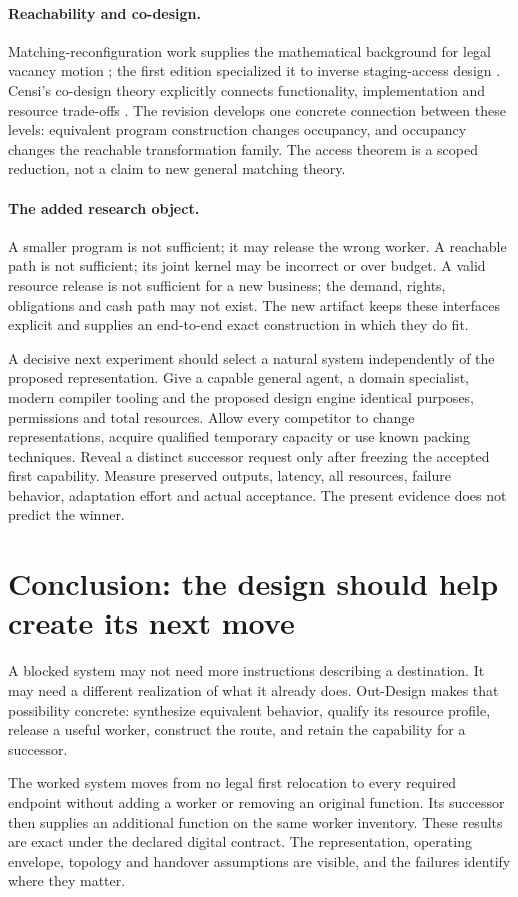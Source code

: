 \documentclass[11pt,letterpaper]{article}
\theoremstyle{definition}\newtheorem{definition}[theorem]{Definition}
\theoremstyle{remark}\newtheorem{remark}[theorem]{Remark}
\newcommand{\phead}[1]{\Needspace{4\baselineskip}\paragraph{#1}}
\begin{document}
\phead{Reachability and co-design.}
Matching-reconfiguration work supplies the mathematical background for legal vacancy motion \citep{aichholzer}; the first edition specialized it to inverse staging-access design \citep{design1}. Censi's co-design theory explicitly connects functionality, implementation and resource trade-offs \citep{censi}. The revision develops one concrete connection between these levels: equivalent program construction changes occupancy, and occupancy changes the reachable transformation family. The access theorem is a scoped reduction, not a claim to new general matching theory.

\phead{The added research object.}
A smaller program is not sufficient; it may release the wrong worker. A reachable path is not sufficient; its joint kernel may be incorrect or over budget. A valid resource release is not sufficient for a new business; the demand, rights, obligations and cash path may not exist. The new artifact keeps these interfaces explicit and supplies an end-to-end exact construction in which they do fit.

A decisive next experiment should select a natural system independently of the proposed representation. Give a capable general agent, a domain specialist, modern compiler tooling and the proposed design engine identical purposes, permissions and total resources. Allow every competitor to change representations, acquire qualified temporary capacity or use known packing techniques. Reveal a distinct successor request only after freezing the accepted first capability. Measure preserved outputs, latency, all resources, failure behavior, adaptation effort and actual acceptance. The present evidence does not predict the winner.

\section{Conclusion: the design should help create its next move}
A blocked system may not need more instructions describing a destination. It may need a different realization of what it already does. Out-Design makes that possibility concrete: synthesize equivalent behavior, qualify its resource profile, release a useful worker, construct the route, and retain the capability for a successor.

The worked system moves from no legal first relocation to every required endpoint without adding a worker or removing an original function. Its successor then supplies an additional function on the same worker inventory. These results are exact under the declared digital contract. The representation, operating envelope, topology and handover assumptions are visible, and the failures identify where they matter.
\end{document}

